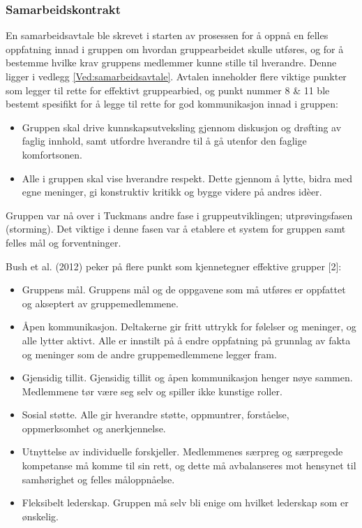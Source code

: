 \subsubsection{Samarbeidskontrakt}

En samarbeidsavtale ble skrevet i starten av prosessen for å oppnå en felles oppfatning innad i gruppen om hvordan gruppearbeidet skulle utføres, og for å bestemme hvilke krav gruppens medlemmer kunne stille til hverandre.
Denne ligger i vedlegg \ref{Ved:samarbeidsavtale}.
Avtalen inneholder flere viktige punkter som legger til rette for effektivt gruppearbied, og punkt nummer 8 \& 11 ble bestemt spesifikt for å legge til rette for god kommunikasjon innad i gruppen:
\begin{itemize}
	\item Gruppen skal drive kunnskapsutveksling gjennom diskusjon og drøfting av faglig innhold, samt utfordre hverandre til å gå utenfor den faglige komfortsonen.
	\item Alle i gruppen skal vise hverandre respekt. Dette gjennom å lytte, bidra med egne meninger, gi konstruktiv kritikk og bygge videre på andres id\`{e}er.
\end{itemize}



Gruppen var nå over i Tuckmans andre fase i gruppeutviklingen; utprøvingsfasen (storming). Det viktige i denne fasen var å etablere et system for gruppen samt felles mål og forventninger. 

Bush et al. (2012) peker på flere punkt som kjennetegner effektive grupper [2]:

\begin{itemize}
	\item Gruppens mål. Gruppens mål og de oppgavene som må utføres er oppfattet og akseptert av gruppemedlemmene.
	\item Åpen kommunikasjon. Deltakerne gir fritt uttrykk for følelser og meninger, og alle lytter aktivt. Alle er innstilt på å endre oppfatning på grunnlag av fakta og meninger som de andre gruppemedlemmene legger fram.
	\item Gjensidig tillit. Gjensidig tillit og åpen kommunikasjon henger nøye sammen. Medlemmene tør være seg selv og spiller ikke kunstige roller.
	\item Sosial støtte. Alle gir hverandre støtte, oppmuntrer, forståelse, oppmerksomhet og anerkjennelse.
	\item Utnyttelse av individuelle forskjeller. Medlemmenes særpreg og særpregede kompetanse må komme til sin rett, og dette må avbalanseres mot hensynet til samhørighet og felles måloppnåelse.
	\item Fleksibelt lederskap. Gruppen må selv bli enige om hvilket lederskap som er ønskelig.
\end{itemize}

